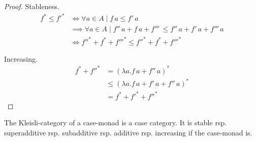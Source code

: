 \documentclass[runningheads,envcountsame]{llncs}
\begin{document}
\begin{proof}
    Stableness.
    \begin{align}
        f^* \leq f'^* & \iff \forall a \in A \mid f\,a \leq f'\,a \\
            & \implies \forall a \in A \mid f''\,a + f\,a + f'''\, \leq f''\,a + f'\,a + f'''\,a \\
            & \iff f''^* + f^* + f'''^* \leq f''^* + f^* + f'''^*
    \end{align}
    
    Increasing.
    \begin{align}
        f^* + f''^* & = (\lambda a. f\,a + f''\,a)^* \\
            & \leq (\lambda a. f\,a + f'\,a + f''\,a)^* \\
            & = f^* + f'^* + f''^*
    \end{align}
\end{proof}
\begin{corollary}
    The Kleisli-category of a case-monad is a case category. It is stable rsp. superadditive rsp. subadditive rsp. additive rsp. increasing if the case-monad is.
\end{corollary}
\end{document}
